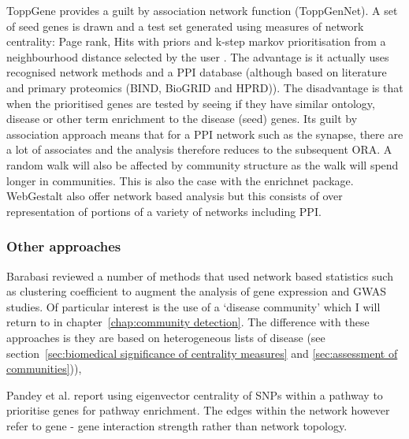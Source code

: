ToppGene  \cite{chen2009toppgene} provides a guilt by association network function (ToppGenNet).  A set of seed genes is drawn and a test set generated using measures of network centrality: Page rank, Hits with priors and k-step markov prioritisation from a neighbourhood distance selected by the user \cite{chen2009disease}. The advantage is it actually uses recognised network methods and a PPI database (although based on literature and primary proteomics (BIND, BioGRID and HPRD)). The disadvantage is that when the prioritised genes are tested by seeing if they have similar ontology, disease or other term enrichment to the disease (seed) genes. Its guilt by association approach means that for a PPI network such as the synapse, there are a lot of associates  and the analysis therefore reduces to the subsequent ORA. A random walk will also be affected by  community structure as the walk will spend longer in communities. This is also the case with the enrichnet package\cite{glaab2012enrichnet}.   
WebGestalt \cite{liao2019webgestalt} also offer network based analysis but this consists of over representation of portions of a variety of networks including PPI.

\subsubsection{Other approaches}
\label{sec:intro other approaches}
Barabasi \cite{barabasi2011network} reviewed a number of methods that used network based statistics such as clustering coefficient to augment the analysis of gene expression and GWAS studies. Of particular interest is the use of a `disease community' which I will return to in chapter~\ref{chap:community detection}. The difference with these approaches is they are based on heterogeneous lists of disease (see section~\ref{sec:biomedical significance of centrality measures} and \ref{sec:assessment of communities})), 

Pandey et al. report using eigenvector centrality of SNPs within a pathway to prioritise genes for pathway enrichment\cite{pandey2012epistasis}. The edges within the network however refer to gene - gene interaction strength rather than network topology. 

